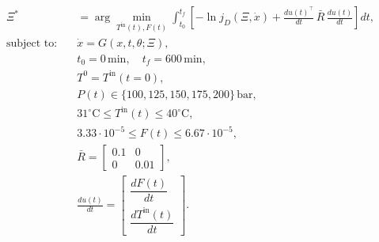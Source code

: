 \documentclass[../Article_Design_of_Experiment.tex]{subfiles}
\begin{document}
	{\footnotesize 
		\begin{equation}
			\begin{aligned}
				\Xi^* &= \arg \min_{T^{\text{in}}(t), F(t)} 
				\int_{t_0}^{t_f} \left[ - \ln j_D(\Xi, \dot{x}) + 
				\frac{du(t)^\top}{dt} \, \bar{R} \, \frac{du(t)}{dt} \right] dt, \\
				\text{subject to:} \quad 
				& \dot{x} = G(x, t, \theta; \Xi), \\
				& t_0 = 0 \, \text{min}, \quad t_f = 600 \, \text{min}, \\
				& T^0 = T^{\text{in}}(t=0), \\
				& P(t) \in \{100, 125, 150, 175, 200\} \, \text{bar}, \\
				& 31^\circ\text{C} \leq T^{\text{in}}(t) \leq 40^\circ\text{C}, \\
				& 3.33 \cdot 10^{-5} \leq F(t) \leq 6.67 \cdot 10^{-5}, \\
				& \bar{R} = 
				\begin{bmatrix} 
					0.1 & 0 \\ 
					0 & 0.01 
				\end{bmatrix}, \\
				& \frac{du(t)}{dt} = 
				\begin{bmatrix} 
					\dfrac{dF(t)}{dt} \\ 
					\dfrac{dT^{\text{in}}(t)}{dt} 
				\end{bmatrix}.
			\end{aligned}
			\label{EQ:Formulation_2}
			\end{equation} }
	
\end{document}
